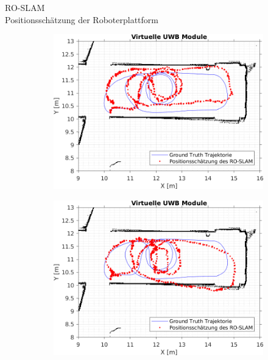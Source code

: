 \documentclass{beamer}
\begin{document}
\begin{frame}{RO-SLAM\\\normalsize{Positionsschätzung der Roboterplattform}}
\begin{figure}
\begin{subfigure}{0.41\linewidth}
		\end{subfigure}
		\par
		\bigskip
		\begin{subfigure}{0.41\linewidth}
			\centering
			\includegraphics[width=\linewidth]{Record_2018-02-08-12-33-53_filtered_21_trajectory_pf}
		\end{subfigure}
		\hfill
		\begin{subfigure}{0.41\linewidth}
			\centering
			\includegraphics[width=\linewidth]{Record_2018-02-08-12-33-53_filtered_22_trajectory_pf}
		\end{subfigure}
	\end{figure}
	
\end{frame}
\end{document}
